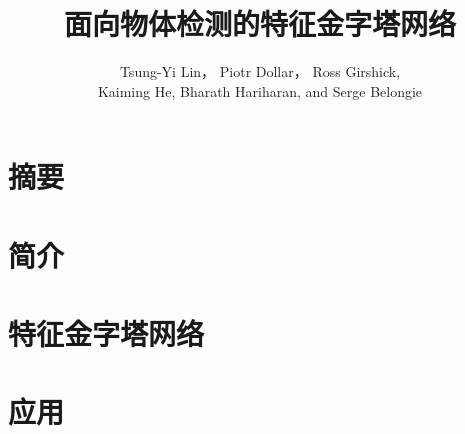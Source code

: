 \documentclass{ctexart}
\title{面向物体检测的特征金字塔网络}
\author{Tsung-Yi Lin， Piotr Dollar， Ross Girshick, \\
Kaiming He, Bharath Hariharan, and Serge Belongie}
\date{}
\begin{document}
\maketitle
\section{摘要}

\section{简介}

\section{特征金字塔网络}

\section{应用}

\printbibliography
\end{document}
